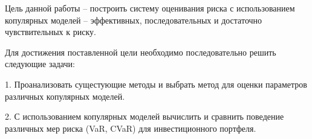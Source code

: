 Цель данной работы -- построить систему оценивания риска с
использованием копулярных моделей -- эффективных, последовательных
и достаточно чувствительных к риску. %


Для достижения поставленной цели необходимо последовательно решить следующие задачи:

1. Проанализовать сущестующие методы и выбрать метод для оценки параметров различных копулярных моделей. 

2. С использованием копулярных моделей вычислить и сравнить поведение различных мер риска (VaR, CVaR) для инвестиционного портфеля.





